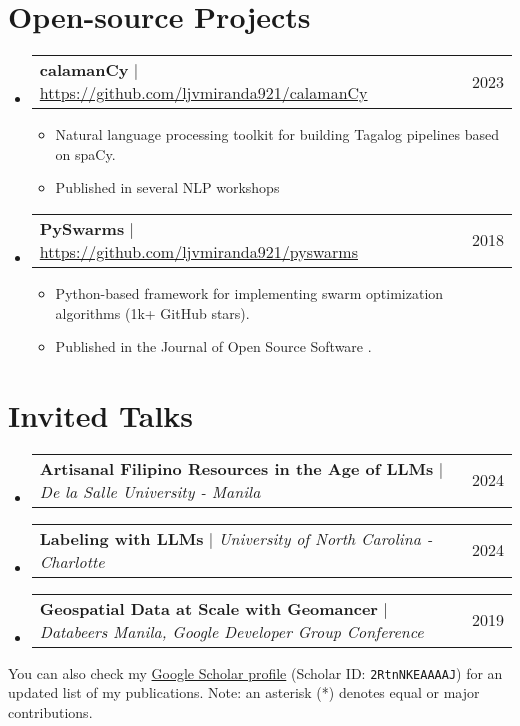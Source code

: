 \documentclass[a4paper,11pt]{article}
\makeatletter
\newcommand{\resumeItem}[1]{
  \item\small{
    {#1 \vspace{-2pt}}
  }
}
\newcommand{\resumeProjectHeading}[2]{
    \item
    \begin{tabular*}{0.97\textwidth}{l@{\extracolsep{\fill}}r}
      \small#1 & #2 \\
    \end{tabular*}\vspace{-7pt}
}
\newcommand{\resumeSubHeadingListStart}{\begin{itemize}[leftmargin=0.15in, label={}]}
\newcommand{\resumeSubHeadingListEnd}{\end{itemize}}
\newcommand{\resumeItemListStart}{\begin{itemize}}
\newcommand{\resumeItemListEnd}{\end{itemize}\vspace{-5pt}}
\makeatother
\begin{document}
\section{Open-source Projects}
\resumeSubHeadingListStart
\resumeProjectHeading
{\textbf{calamanCy} $|$ \url{https://github.com/ljvmiranda921/calamanCy}}{2023}
\resumeItemListStart
\resumeItem{Natural language processing toolkit for building Tagalog pipelines based on spaCy.}
\resumeItem{Published in several NLP workshops \cite{miranda2023calamancy,miranda2023developing}}
\resumeItemListEnd
\resumeProjectHeading
{\textbf{PySwarms} $|$ \url{https://github.com/ljvmiranda921/pyswarms}}{2018}
\resumeItemListStart
\resumeItem{Python-based framework for implementing swarm optimization algorithms (1k+ GitHub stars).}
\resumeItem{Published in the Journal of Open Source Software \cite{miranda2018pyswarms}.}
\resumeItemListEnd
\resumeSubHeadingListEnd

\section{Invited Talks}
\resumeSubHeadingListStart
\resumeProjectHeading
{\textbf{Artisanal Filipino Resources in the Age of LLMs} $|$ \emph{De la Salle University - Manila}}{2024}
\resumeProjectHeading
{\textbf{Labeling with LLMs} $|$ \emph{University of North Carolina - Charlotte}}{2024}
\resumeProjectHeading
{\textbf{Geospatial Data at Scale with Geomancer} $|$ \emph{Databeers Manila, Google Developer Group Conference}}{2019}
\resumeSubHeadingListEnd


\newpage
You can also check my \href{https://scholar.google.com/citations?user=2RtnNKEAAAAJ&hl=en}{Google Scholar profile}
(Scholar ID: \texttt{2RtnNKEAAAAJ})
for an updated list of my publications.
Note: an asterisk (*) denotes equal or major contributions.
\nocite{*}
{
  \small
  \newrefcontext[labelprefix=J]
  \printbibliography[keyword=journal,title=Journal Publications]
  \newrefcontext[labelprefix=C]
  \printbibliography[keyword=conference,title=Conference Papers]
  \newrefcontext[labelprefix=W]
  \printbibliography[keyword=workshop,title=Peer-Reviewed Workshop Papers]
  \newrefcontext[labelprefix=P]
  \printbibliography[keyword=preprint,title=Preprints \& Technical Reports]
}

%   
%   


\end{document}

